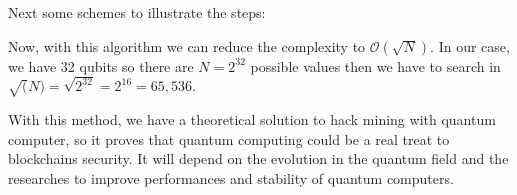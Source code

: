 Next some schemes to illustrate the steps:

\clearpage

\begin{figure}[ht]
\centering

\hspace{1cm}
\end{figure}
\medskip

\begin{figure}[ht]
\centering

\hspace{1cm}
\end{figure}
\medskip

Now, with this algorithm we can reduce the complexity to $\mathcal{O}(\sqrt{N})$. In our case, we have 32 qubits so there are $N = 2^{32}$ possible values then we have to search in $\sqrt(N) = \sqrt{2^{32}} = 2^{16} = 65,536$. \newline

With this method, we have a theoretical solution to hack mining with quantum computer, so it proves that quantum computing could be a real treat to blockchains security. It will depend on the evolution in the quantum field and the researches to improve performances and stability of quantum computers.
